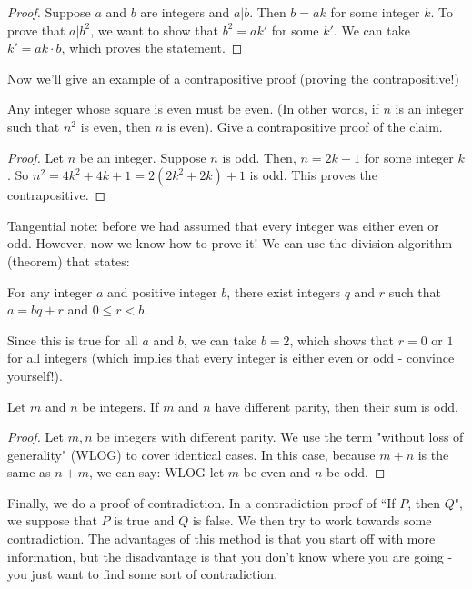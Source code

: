 \begin{proof}
Suppose $a$ and $b$ are integers and $a | b$. Then $b = ak$ for some integer $k$. To prove that $a | b^2$, we want to show that $b^2 = ak'$ for some $k'$. We can take $k' = ak\cdot b$, which proves the statement.
\end{proof}

Now we'll give an example of a contrapositive proof (proving the contrapositive!)

\begin{example}
Any integer whose square is even must be even. (In other words, if $n$ is an integer such that $n^2$ is even, then $n$ is even). Give a contrapositive proof of the claim.
\end{example}

\begin{proof}
Let $n$ be an integer. Suppose $n$ is odd. Then, $n = 2k+1$ for some integer $k$. So $n^2 = 4k^2 + 4k + 1 = 2(2k^2 + 2k) + 1$ is odd. This proves the contrapositive.
\end{proof}

Tangential note: before we had assumed that every integer was either even or odd. However, now we know how to prove it! We can use the division algorithm (theorem) that states:

\begin{theorem}
For any integer $a$ and positive integer $b$, there exist integers $q$ and $r$ such that $a = bq + r$ and $0 \le r < b$.
\end{theorem}

Since this is true for all $a$ and $b$, we can take $b = 2$, which shows that $r = 0$ or $1$ for all integers (which implies that every integer is either even or odd - convince yourself!).

\begin{example}
Let $m$ and $n$ be integers. If $m$ and $n$ have different parity, then their sum is odd.
\end{example}

\begin{proof}
Let $m, n$ be integers with different parity. We use the term "without loss of generality" (WLOG) to cover identical cases. In this case, because $m+n$ is the same as $n+m$, we can say: WLOG let $m$ be even and $n$ be odd.
\end{proof}

Finally, we do a proof of contradiction. In a contradiction proof of ``If $P$, then $Q$", we suppose that $P$ is true and $Q$ is false. We then try to work towards some contradiction. The advantages of this method is that you start off with more information, but the disadvantage is that you don't know where you are going - you just want to find some sort of contradiction.

